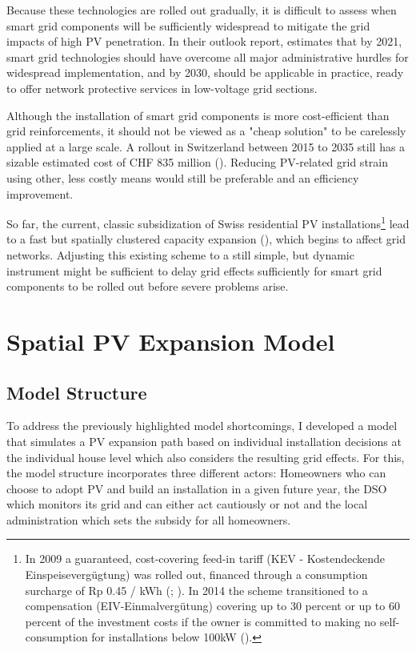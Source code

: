 \documentclass[12PT, ]{article}
\begin{document}
Because these technologies are rolled out gradually, it is difficult to assess when smart grid components will be sufficiently widespread to mitigate the grid impacts of high PV penetration.
In their outlook report, \cite{bfe_smartgridroadmap2015} estimates that by 2021, smart grid technologies should have overcome all major administrative hurdles for widespread implementation, and by 2030, should be applicable in practice, ready to offer network protective services in low-voltage grid sections.

Although the installation of smart grid components is more cost-efficient than grid reinforcements, it should not be viewed as a "cheap solution" to be carelessly applied at a large scale. A rollout in Switzerland between 2015 to 2035 still has a sizable estimated cost of CHF 835 million (\cite{ecoplan2015}).
Reducing PV-related grid strain using other, less costly means would still be preferable and an efficiency improvement. 


So far, the current, classic subsidization of Swiss residential PV installations\footnote{In 2009 a guaranteed, cost-covering feed-in tariff (KEV - Kostendeckende Einspeisevergügtung) was rolled out, financed through a consumption surcharge of Rp 0.45 / kWh (\cite{bfe_kev_charge2008}; \cite{bfe_kev2009}). In 2014 the scheme transitioned to a compensation (EIV-Einmalvergütung) covering up to 30 percent or up to 60 percent of the investment costs if the owner is committed to making no self-consumption for installations below 100kW (\cite{bfe_kleiv2018}).}
lead to a fast but spatially clustered capacity expansion (\cite{muller2020}), which begins to affect grid networks. 
Adjusting this existing scheme to a still simple, but dynamic instrument might be sufficient to delay grid effects sufficiently for smart grid components to be rolled out before severe problems arise. 



\section{Spatial PV Expansion Model} \label{sec:methodology}%


\subsection{Model Structure} \label{subsec:}%
To address the previously highlighted model shortcomings, I developed a model that simulates a PV expansion path based on individual installation decisions at the individual house level which also considers the resulting grid effects.
For this, the model structure incorporates three different actors: Homeowners who can choose to adopt PV and build an installation in a given future year, the DSO which monitors its grid and can either act cautiously or not and the local administration which sets the subsidy for all homeowners. 
\end{document}

